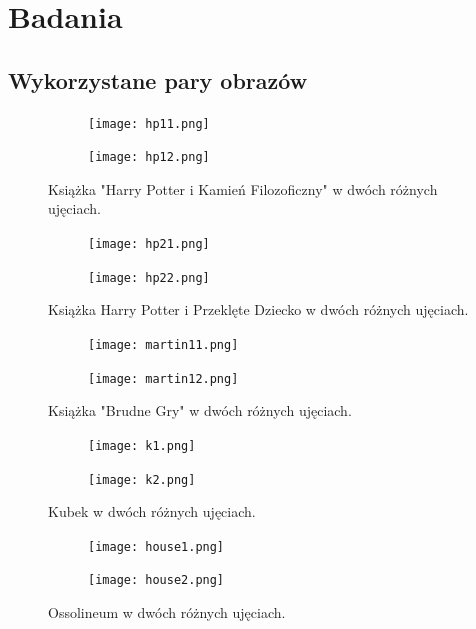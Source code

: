\documentclass{article}
\begin{document}
	\section{Badania}
	\subsection{Wykorzystane pary obrazów}
	\begin{figure}[H]
		\centering
		\begin{subfigure}[b]{0.4\linewidth}
			\texttt{[image: hp11.png]}
		\end{subfigure}
		\begin{subfigure}[b]{0.4\linewidth}
			\texttt{[image: hp12.png]}
		\end{subfigure}
		\caption{Książka "Harry Potter i Kamień Filozoficzny" w dwóch różnych ujęciach.}
		\label{fig:hp1}
	\end{figure}
	\begin{figure}[H]
		\centering
		\begin{subfigure}[b]{0.4\linewidth}
			\texttt{[image: hp21.png]}
		\end{subfigure}
		\begin{subfigure}[b]{0.4\linewidth}
			\texttt{[image: hp22.png]}
		\end{subfigure}
		\caption{Książka Harry Potter i Przeklęte Dziecko w dwóch różnych ujęciach.}
		\label{fig:hp2}
	\end{figure}
	\begin{figure}[H]
		\centering
		\begin{subfigure}[b]{0.4\linewidth}
			\texttt{[image: martin11.png]}
		\end{subfigure}
		\begin{subfigure}[b]{0.4\linewidth}
			\texttt{[image: martin12.png]}
		\end{subfigure}
		\caption{Książka "Brudne Gry" w dwóch różnych ujęciach.}
		\label{fig:martin}
	\end{figure}
	\begin{figure}[H]
		\centering
		\begin{subfigure}[b]{0.4\linewidth}
			\texttt{[image: k1.png]}
		\end{subfigure}
		\begin{subfigure}[b]{0.4\linewidth}
			\texttt{[image: k2.png]}
		\end{subfigure}
		\caption{Kubek w dwóch różnych ujęciach.}
		\label{fig:kubek}
	\end{figure}
	\begin{figure}[H]
		\centering
		\begin{subfigure}[b]{0.4\linewidth}
			\texttt{[image: house1.png]}
		\end{subfigure}
		\begin{subfigure}[b]{0.4\linewidth}
			\texttt{[image: house2.png]}
		\end{subfigure}
		\caption{Ossolineum w dwóch różnych ujęciach.}
		\label{fig:ossolineum}
	\end{figure}
\end{document}
